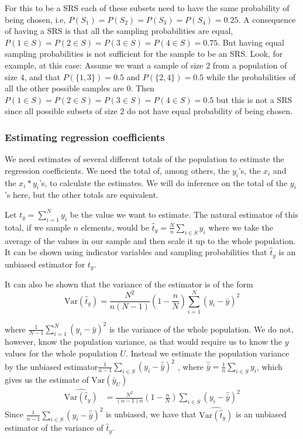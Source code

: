 \documentclass{article}
\begin{document}
For this to be a SRS each of these subsets need to have the same probability of
being chosen, i.e, \(P(S_1) = P(S_2) = P(S_3) = P(S_4) = 0.25\). A consequence of
having a SRS is that all the sampling probabilities are equal, \(P(1 \in S) =
P(2 \in S) = P(3 \in S) = P(4 \in S) = 0.75\). But having equal sampling
probabilities is not sufficient for the sample to be an SRS.
Look, for example, at this case:
Assume we want a sample of size \(2\) from a population of size \(4\), and that
\(P(\{1, 3\}) = 0.5\) and \(P(\{2, 4\}) = 0.5\) while the probabilities of all the
other possible samples are \(0\). Then \(P(1 \in S) = P(2 \in S) = P(3 \in S) = P(4 \in S) = 0.5\)
but this is not a SRS since all possible subsets of size \(2\) do not have equal
probability of being chosen.


\subsubsection{Estimating regression coefficients}

We need estimates of several different totals of the population to estimate the
regression coefficients. We need the total of, among others, the \(y_i\)'s, the
\(x_i\) and the \(x_i * y_i\)'s, to calculate the estimates.
We will do inference on the total of the \(y_i\)'s here, but the other totals
are equivalent.

Let
\(
 t_y = \sum_{i = 1}^{N} y_i
\)
be the value we want to estimate.
The natural estimator of this total, if we sample \(n\) elements, would be
\(
\hat{t}_y = \frac{N}{n}\sum_{i \in S} y_i
\)
where we take the average of the values in our sample and then scale it up to
the whole population.
It can be shown using indicator variables and sampling probabilities that
\(\hat{t}_y\) is an unbiased estimator for \(t_y\).

It can also be shown that the variance of the estimator is of the form \begin{equation*}
\mathrm{Var} \left( \hat{t}_y \right) = \frac{N^2}{n \left( N - 1 \right)} \left( 1 - \frac{n}{N} \right) \sum_{i = 1}^N (y_i - \bar{y})^2 
\end{equation*}

where
\(
\frac{1}{N - 1} \sum_{i = 1}^N (y_i - \bar{y})^2
\)
is the variance of the whole population.
We do not, however, know the population variance, as that would require us to know the \(y\) values
for the whole population \(U\). Instead we estimate the population variance by the unbiased estimator\(
 \frac{1}{n - 1} \sum_{i \in S} \left( y_i - \hat{\bar{y}} \right)^2
\)
, where \(\hat{\bar{y}} = \frac{1}{n} \sum_{i \in S} y_i \), which gives us the estimate of \(\mathrm{Var}(\bar{y}_U)\)\begin{align*}
 \widehat{\mathrm{Var}(\hat{t}_y)}
 &=\frac{N^2}{\left( n - 1 \right)n} \left( 1 - \frac{n}{N} \right) \sum_{i \in S} \left( y_i - \hat{\bar{y}} \right)^2
\end{align*}
Since \(\frac{1}{n - 1} \sum_{i \in S} \left( y_i - \hat{\bar{y}} \right)^2\) is unbiased, we have that \(\widehat{\mathrm{Var}(\hat{t}_y)}\) is an unbiased estimator of the variance of \(\hat{t}_y\).
\end{document}

